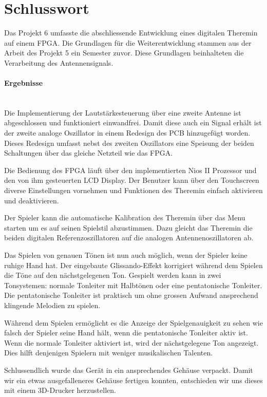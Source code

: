 \clearpage
\section{Schlusswort}\label{sec:Schlusswort}
Das Projekt 6 umfasste die abschliessende Entwicklung eines digitalen Theremin auf einem FPGA. Die Grundlagen für die Weiterentwicklung stammen aus der Arbeit des Projekt 5 ein Semester zuvor. Diese Grundlagen beinhalteten die Verarbeitung des Antennensignals. 

\paragraph{Ergebnisse}\mbox{}\\

Die Implementierung der Lautstärkesteuerung über eine zweite Antenne ist abgeschlossen und funktioniert einwandfrei. 
Damit diese auch ein Signal erhält ist der zweite analoge Oszillator in einem Redesign des PCB hinzugefügt worden. Dieses Redesign umfasst nebst des zweiten Oszillators eine Speisung der beiden Schaltungen über das gleiche Netzteil wie das FPGA.

Die Bedienung des FPGA läuft über den implementierten Nios II Prozessor und den von ihm gesteuerten LCD Display. Der Benutzer kann über den Touchscreen diverse Einstellungen vornehmen und Funktionen des Theremin einfach aktivieren und deaktivieren.

Der Spieler kann die automatische Kalibration des Theremin über das Menu starten um es auf seinen Spielstil abzustimmen. Dazu gleicht das Theremin die beiden digitalen Referenzoszillatoren auf die analogen Antennenoszillatoren ab.

Das Spielen von genauen Tönen ist nun auch möglich, wenn der Spieler keine ruhige Hand hat. Der eingebaute Glissando-Effekt korrigiert während dem Spielen die Töne auf den nächstgelegenen Ton. Gespielt werden kann in zwei Tonsystemen: normale Tonleiter mit Halbtönen oder eine pentatonische Tonleiter. Die pentatonische Tonleiter ist praktisch um ohne grossen Aufwand ansprechend klingende Melodien zu spielen. 

Während dem Spielen ermöglicht es die Anzeige der Spielgenauigkeit zu sehen wie falsch der Spieler seine Hand hält, wenn die pentatonische Tonleiter aktiv ist. Wenn die normale Tonleiter aktiviert ist, wird der nächstgelegene Ton angezeigt. Dies hilft denjenigen Spielern mit weniger musikalischen Talenten.

Schlussendlich wurde das Gerät in ein ansprechendes Gehäuse verpackt. Damit wir ein etwas ausgefalleneres Gehäuse fertigen konnten, entschieden wir uns dieses mit einem 3D-Drucker herzustellen.

